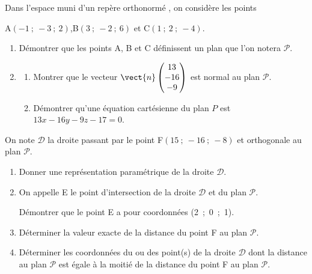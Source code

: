 \medskip

Dans l'espace muni d'un repère orthonormé \Oijk, on considère les
points
\begin{center}A$(-1~;~-3~;~2)$,\qquad B$(3~;~-2~;~6)$ \quad et \quad  C$(1~;~2~;~-4)$.\end{center}

\smallskip

\begin{enumerate}
\item Démontrer que les points A, B et C définissent un plan que l'on notera $\mathcal{P}$.
\item 
	\begin{enumerate}
		\item Montrer que le vecteur $\vect{n}\begin{pmatrix}13\\-16\\-9\end{pmatrix}$  est normal au plan $\mathcal{P}$.
		\item Démontrer qu'une équation cartésienne du plan $P$ est $13x - 16y - 9z- 17 = 0$.
	\end{enumerate}
\end{enumerate}

On note $\mathcal{D}$ la droite passant par le point F$(15~;~-16~;~-8)$ et orthogonale au plan $\mathcal{P}$.
\begin{enumerate}[resume]
\item Donner une représentation paramétrique de la droite $\mathcal{D}$.
\item On appelle E le point d'intersection de la droite $\mathcal{D}$ et du plan $\mathcal{P}$.

Démontrer que le point E a pour coordonnées (2~;~0~;~1).
\item Déterminer la valeur exacte de la distance du point F au plan $\mathcal{P}$.
\item Déterminer les coordonnées du ou des point(s) de la droite $\mathcal{D}$ dont la distance au plan $\mathcal{P}$ est égale à la moitié de la distance du point F au plan $\mathcal{P}$.
\end{enumerate}
